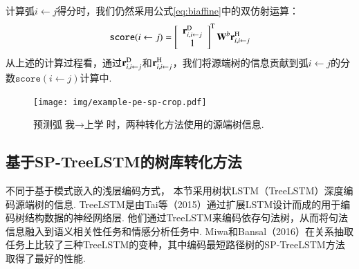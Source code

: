 计算弧$i \leftarrow j$得分时，我们仍然采用公式\ref{eq:biaffine}中的双仿射运算：
\begin{equation} \label{eq:biaffine_pat}
    \texttt{score}(i \leftarrow j) =  \left[
        \begin{array}{c}
            \mathbf{r}_{i,i \leftarrow j}^{\textup{D}} \\
            1
        \end{array}
        \right]^\mathrm{T}
    \mathbf{W}^b  \mathbf{r}_{i,i \leftarrow j}^{\textup{H}}
\end{equation}
从上述的计算过程看，通过$\mathbf{r}_{i,i \leftarrow j}^{\textup{D}}$和$\mathbf{r}_{i,i \leftarrow j}^{\textup{H}}$，我们将源端树的信息贡献到弧$i \leftarrow j$的分数$\texttt{score}(i \leftarrow j)$计算中.

\begin{figure}[hb]
    \centering
    \texttt{[image: img/example-pe-sp-crop.pdf]}
    \caption{预测弧$\mbox{我}\rightarrow \mbox{上学}$时，两种转化方法使用的源端树信息. }
    \label{fig:example_pe_sp}
\end{figure}

\subsection{基于SP-TreeLSTM的树库转化方法}
不同于基于模式嵌入的浅层编码方式，
本节采用树状LSTM（TreeLSTM）深度编码源端树的信息.
TreeLSTM是由Tai等（2015）\cite{tai2015improved}通过扩展LSTM设计而成的用于编码树结构数据的神经网络层.
他们通过TreeLSTM来编码依存句法树，从而将句法信息融入到语义相关性任务和情感分析任务中.
Miwa和Bansal（2016）\cite{miwa-p16-treelstm-re}在关系抽取任务上比较了三种TreeLSTM的变种，其中编码最短路径树的SP-TreeLSTM方法取得了最好的性能.

